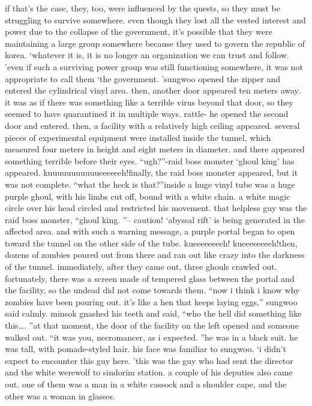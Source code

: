  if that’s the case, they, too, were influenced by the quests, so they must be struggling to survive somewhere.
even though they lost all the vested interest and power due to the collapse of the government, it’s possible that they were maintaining a large group somewhere because they used to govern the republic of korea.
‘whatever it is, it is no longer an organization we can trust and follow.
’even if such a surviving power group was still functioning somewhere, it was not appropriate to call them ‘the government.
’sungwoo opened the zipper and entered the cylindrical vinyl area.
 then, another door appeared ten meters away.
 it was as if there was something like a terrible virus beyond that door, so they seemed to have quarantined it in multiple ways.
rattle-
he opened the second door and entered.
 then, a facility with a relatively high ceiling appeared.
 several pieces of experimental equipment were installed inside the tunnel, which measured four meters in height and eight meters in diameter.
 and there appeared something terrible before their eyes.
“ugh?”-raid boss monster ‘ghoul king’ has appeared.
kuuuuuuuuuuueeeeeeh!finally, the raid boss monster appeared, but it was not complete.
“what the heck is that?”inside a huge vinyl tube was a huge purple ghoul, with his limbs cut off, bound with a white chain.
 a white magic circle over his head circled and restricted his movement.
that helpless guy was the raid boss monster, “ghoul king.
”– caution! ‘abyssal rift’ is being generated in the affected area.
and with such a warning message, a purple portal began to open toward the tunnel on the other side of the tube.
kueeeeeeeeh! kueeeeeeeeh!then, dozens of zombies poured out from there and ran out like crazy into the darkness of the tunnel.
 immediately, after they came out, three ghouls crawled out.
fortunately, there was a screen made of tempered glass between the portal and the facility, so the undead did not come towards them.
“now i think i know why zombies have been pouring out.
 it’s like a hen that keeps laying eggs,” sungwoo said calmly.
minsok gnashed his teeth and said, “who the hell did something like this….
”at that moment, the door of the facility on the left opened and someone walked out.
“it was you, necromancer, as i expected.
”he was in a black suit.
 he was tall, with pomade-styled hair.
 his face was familiar to sungwoo.
‘i didn’t expect to encounter this guy here.
’this was the guy who had sent the director and the white werewolf to sindorim station.
a couple of his deputies also came out.
 one of them was a man in a white cassock and a shoulder cape, and the other was a woman in glasses.
